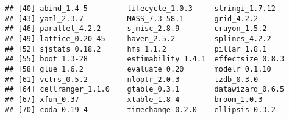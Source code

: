 \documentclass[
]{article}
\begin{document}
\begin{verbatim}
## [40] abind_1.4-5         lifecycle_1.0.3     stringi_1.7.12     
## [43] yaml_2.3.7          MASS_7.3-58.1       grid_4.2.2         
## [46] parallel_4.2.2      sjmisc_2.8.9        crayon_1.5.2       
## [49] lattice_0.20-45     haven_2.5.2         splines_4.2.2      
## [52] sjstats_0.18.2      hms_1.1.2           pillar_1.8.1       
## [55] boot_1.3-28         estimability_1.4.1  effectsize_0.8.3   
## [58] glue_1.6.2          evaluate_0.20       modelr_0.1.10      
## [61] vctrs_0.5.2         nloptr_2.0.3        tzdb_0.3.0         
## [64] cellranger_1.1.0    gtable_0.3.1        datawizard_0.6.5   
## [67] xfun_0.37           xtable_1.8-4        broom_1.0.3        
## [70] coda_0.19-4         timechange_0.2.0    ellipsis_0.3.2
\end{verbatim}
\end{document}
